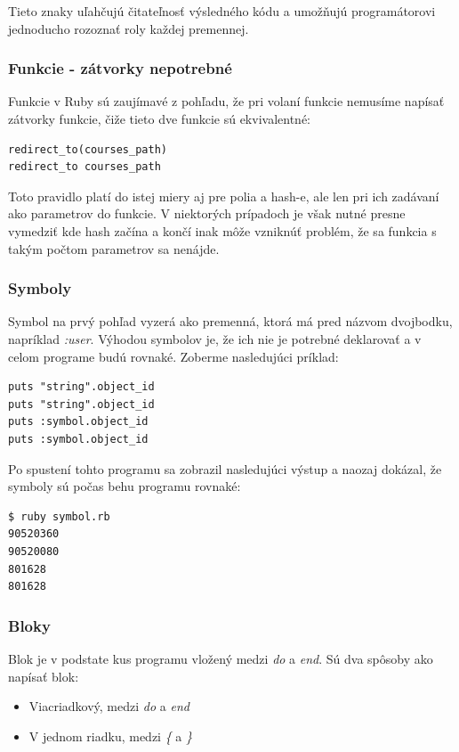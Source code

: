 Tieto znaky uľahčujú čitateľnosť výsledného kódu a umožňujú programátorovi jednoducho rozoznať roly každej premennej. \citep{web:rubylang}

\subsubsection{Funkcie - zátvorky nepotrebné }

Funkcie v Ruby sú zaujímavé z pohľadu, že pri volaní funkcie nemusíme napísať zátvorky funkcie, čiže tieto dve funkcie sú ekvivalentné:

\begin{verbatim}
redirect_to(courses_path)
redirect_to courses_path
\end{verbatim}

Toto pravidlo platí do istej miery aj pre polia a hash-e, ale len pri ich zadávaní ako parametrov do funkcie. V niektorých prípadoch je však nutné presne vymedziť kde hash začína a končí inak môže vzniknúť problém, že sa funkcia s takým počtom parametrov sa nenájde.

\subsubsection{Symboly}

Symbol na prvý pohľad vyzerá ako premenná, ktorá má pred názvom dvojbodku, napríklad \emph{:user}. Výhodou symbolov je, že ich nie je potrebné deklarovať a v celom programe budú rovnaké. Zoberme nasledujúci príklad:

\begin{verbatim}
puts "string".object_id
puts "string".object_id
puts :symbol.object_id
puts :symbol.object_id
\end{verbatim}

Po spustení tohto programu sa zobrazil nasledujúci výstup a naozaj dokázal, že symboly sú počas behu programu rovnaké:

\begin{verbatim}
$ ruby symbol.rb
90520360
90520080
801628
801628
\end{verbatim}

\subsubsection{Bloky}

Blok je v podstate kus programu vložený medzi \emph{do} a \emph{end}. Sú dva spôsoby ako napísať blok:

\begin{itemize}
    \item Viacriadkový, medzi \emph{do} a \emph{end}
    \item V jednom riadku, medzi \emph{\{} a \emph{\}}
\end{itemize}

